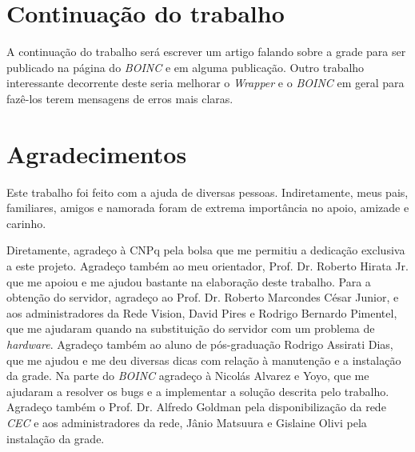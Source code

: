 \section{Continuação do trabalho}

A continuação do trabalho será escrever um artigo falando sobre a grade para ser publicado na página do \emph{BOINC} e em 
alguma publicação. Outro trabalho interessante decorrente deste 
seria melhorar o \emph{Wrapper} e o \emph{BOINC} em geral para fazê-los terem mensagens de erros mais claras. 

\section{Agradecimentos}

Este trabalho foi feito com a ajuda de diversas pessoas. Indiretamente, meus pais, familiares, amigos e namorada foram de extrema importância 
no apoio, amizade e carinho. 

Diretamente, agradeço à CNPq pela bolsa que me permitiu a dedicação exclusiva a este projeto. Agradeço também ao meu orientador, 
Prof. Dr. Roberto Hirata Jr. que me apoiou e me ajudou bastante na elaboração deste trabalho. Para a obtenção do servidor,
agradeço ao Prof. Dr. Roberto Marcondes César Junior, e aos administradores da Rede Vision, David Pires e Rodrigo Bernardo Pimentel, 
que me ajudaram quando na substituição do servidor com um problema de \emph{hardware}. Agradeço também ao aluno de pós-graduação
Rodrigo Assirati Dias, que me ajudou e me deu diversas dicas com relação à manutenção e a instalação da grade. Na parte do \emph{BOINC}
agradeço à Nicolás Alvarez e Yoyo, que me ajudaram a resolver os bugs e a implementar a solução descrita pelo trabalho. Agradeço também 
o Prof. Dr. Alfredo Goldman pela disponibilização da rede \emph{CEC} e aos administradores da rede, Jânio Matsuura e Gislaine Olivi
pela instalação da grade.



